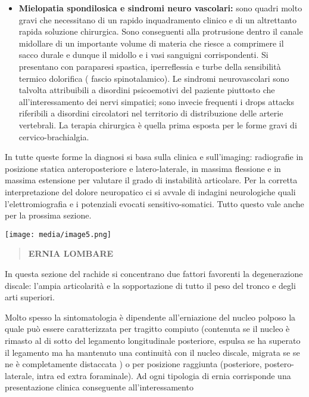 \documentclass[]{article}
\begin{document}
\begin{itemize}
\item
  \textbf{Mielopatia spondilosica e sindromi neuro vascolari:} sono
  quadri molto gravi che necessitano di un rapido inquadramento clinico
  e di un altrettanto rapida soluzione chirurgica. Sono conseguenti alla
  protrusione dentro il canale midollare di un importante volume di
  materia che riesce a comprimere il sacco durale e dunque il midollo e
  i vasi sanguigni corrispondenti. Si presentano con paraparesi
  spastica, iperreflessia e turbe della sensibilità termico dolorifica (
  fascio spinotalamico). Le sindromi neurovascolari sono talvolta
  attribuibili a disordini psicoemotivi del paziente piuttosto che
  all'interessamento dei nervi simpatici; sono invecie frequenti i drops
  attacks riferibili a disordini circolatori nel territorio di
  distribuzione delle arterie vertebrali. La terapia chirurgica è quella
  prima esposta per le forme gravi di cervico-brachialgia.
\end{itemize}

In tutte queste forme la diagnosi si basa sulla clinica e sull'imaging:
radiografie in posizione statica anteroposteriore e latero-laterale, in
massima flessione e in massima estensione per valutare il grado di
instabilità articolare. Per la corretta interpretazione del dolore
neuropatico ci si avvale di indagini neurologiche quali
l'elettromiografia e i potenziali evocati sensitivo-somatici. Tutto
questo vale anche per la prossima sezione.

\texttt{[image: media/image5.png]}

\begin{quote}
\textbf{ERNIA LOMBARE}
\end{quote}

In questa sezione del rachide si concentrano due fattori favorenti la
degenerazione discale: l'ampia articolarità e la sopportazione di tutto
il peso del tronco e degli arti superiori.

Molto spesso la sintomatologia è dipendente all'erniazione del nucleo
polposo la quale può essere caratterizzata per tragitto compiuto
(contenuta se il nucleo è rimasto al di sotto del legamento
longitudinale posteriore, espulsa se ha superato il legamento ma ha
mantenuto una continuità con il nucleo discale, migrata se se ne è
completamente distaccata ) o per posizione raggiunta (posteriore,
postero-laterale, intra ed extra foraminale). Ad ogni tipologia di ernia
corrisponde una presentazione clinica conseguente all'interessamento
\end{document}
